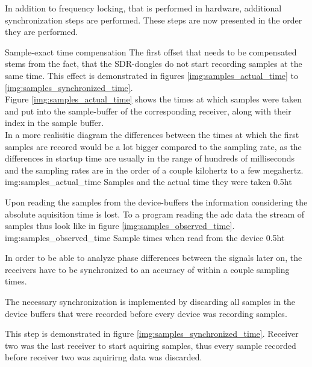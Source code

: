 In addition to frequency locking, that is performed in
hardware, additional synchronization steps are
performed. These steps are now presented in the
order they are performed. \\

\begin{subchapter}{Sample-exact time compensation}
  The first offset that needs to be compensated stems
  from the fact, that the SDR-dongles do not start
  recording samples at the same time.
  This effect is demonstrated in figures
  \ref{img:samples_actual_time} to \ref{img:samples_synchronized_time}. \\

  Figure \ref{img:samples_actual_time} shows the
  times at which samples were taken and put into the
  sample-buffer of the corresponding receiver, along
  with their index in the sample buffer.  \\

  In a more realisitic diagram the differences between the
  times at which the first samples are recored would be
  a lot bigger compared to the sampling rate, as the
  differences in startup time are usually in the range
  of hundreds of milliseconds and the sampling rates are
  in the order of a couple kilohertz to a few megahertz. \\

               {img:samples_actual_time}
               {Samples and the actual time they were taken}
               {0.5}{ht}

  Upon reading the samples from the device-buffers
  the information considering the absolute aquisition time is
  lost. To a program reading the \acrshort{adc} data the
  stream of samples thus look like in figure \ref{img:samples_observed_time}. \\

               {img:samples_observed_time}
               {Sample times when read from the device}
               {0.5}{ht}

  In order to be able to analyze phase differences between
  the signals later on, the receivers have to be synchronized to
  an accuracy of within a couple sampling times.

  The necessary synchronization is implemented by discarding
  all samples in the device buffers that were recorded
  before every device was recording samples.

  This step is demonstrated in figure \ref{img:samples_synchronized_time}.
  Receiver two was the last receiver to start aquiring samples,
  thus every sample recorded before receiver two was aquirirng
  data was discarded.


\end{subchapter}
